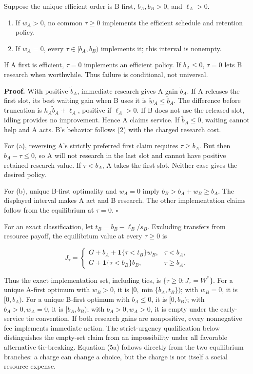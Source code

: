 \documentclass[
  11pt,
]{article}
\begin{document}
Suppose the unique efficient order is B first, \(b_A,b_B>0\), and
\(\ell_A>0\).

\begin{enumerate}
\def\labelenumi{(\alph{enumi})}
\item
  If \(w_A>0\), no common \(\tau\geq0\) implements the efficient
  schedule and retention policy.
\item
  If \(w_A=0\), every \(\tau\in[b_A,b_B)\) implements it; this interval
  is nonempty.
\end{enumerate}

If A first is efficient, \(\tau=0\) implements an efficient policy. If
\(b_A\leq0\), \(\tau=0\) lets B research when worthwhile. Thus failure
is conditional, not universal.

\textbf{Proof.} With positive \(\tilde b_A\), immediate research gives A
gain \(\tilde b_A\). If A releases the first slot, its best waiting gain
when B uses it is \(\tilde w_A\leq\tilde b_A\). The difference before
truncation is \(h_A\tilde b_A+\ell_A\), positive if \(\ell_A>0\). If B
does not use the released slot, idling provides no improvement. Hence A
claims service. If \(\tilde b_A\leq0\), waiting cannot help and A acts.
B's behavior follows (2) with the charged research cost.

For (a), reversing A's strictly preferred first claim requires
\(\tau\geq b_A\). But then \(b_A-\tau\leq0\), so A will not research in
the last slot and cannot have positive retained research value. If
\(\tau<b_A\), A takes the first slot. Neither case gives the desired
policy.

For (b), unique B-first optimality and \(w_A=0\) imply
\(b_B>b_A+w_B\geq b_A\). The displayed interval makes A act and B
research. The other implementation claims follow from the equilibrium at
\(\tau=0\). \(\square\)

For an exact classification, let \(t_B=b_B-\ell_B/s_B\). Excluding
transfers from resource payoff, the equilibrium value at every
\(\tau\geq0\) is

\[J_\tau=\begin{cases}
G+b_A+\mathbf1\{\tau<t_B\}w_B,&\tau<b_A,\\
G+\mathbf1\{\tau<b_B\}b_B,&\tau\geq b_A.
\end{cases} \tag{5a}\]

Thus the exact implementation set, including ties, is
\(\{\tau\geq0:J_\tau=W^*\}\). For a unique A-first optimum with
\(w_B>0\), it is \([0,\min\{b_A,t_B\})\); with \(w_B=0\), it is
\([0,b_A)\). For a unique B-first optimum with \(b_A\leq0\), it is
\([0,b_B)\); with \(b_A>0,w_A=0\), it is \([b_A,b_B)\); with
\(b_A>0,w_A>0\), it is empty under the early-service tie convention. If
both research gains are nonpositive, every nonnegative fee implements
immediate action. The strict-urgency qualification below distinguishes
the empty-set claim from an impossibility under all favorable
alternative tie-breaking. Equation (5a) follows directly from the two
equilibrium branches: a charge can change a choice, but the charge is
not itself a social resource expense.
\end{document}
